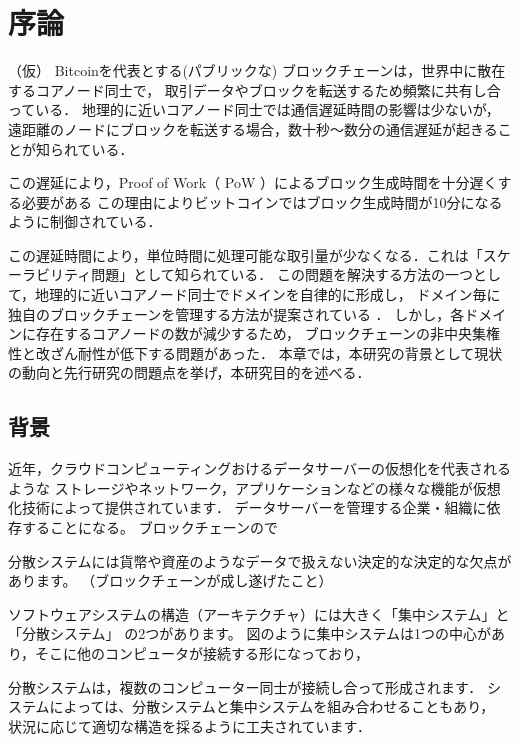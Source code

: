 \documentclass[a4paper,12pt]{jsarticle}
\begin{document}

\section{序論}

（仮）
Bitcoinを代表とする(パブリックな) ブロックチェーンは，世界中に散在するコアノード同士で，
取引データやブロックを転送するため頻繁に共有し合っている．
地理的に近いコアノード同士では通信遅延時間の影響は少ないが，
遠距離のノードにブロックを転送する場合，数十秒〜数分の通信遅延が起きることが知られている．

この遅延により，Proof of Work（ PoW ）によるブロック生成時間を十分遅くする必要がある
この理由によりビットコインではブロック生成時間が10分になるように制御されている．

この遅延時間により，単位時間に処理可能な取引量が少なくなる．これは「スケーラビリティ問題」として知られている． 
この問題を解決する方法の一つとして，地理的に近いコアノード同士でドメインを自律的に形成し，
ドメイン毎に独自のブロックチェーンを管理する方法が提案されている \cite{fujihara1}\cite{fujihara2}．
しかし，各ドメインに存在するコアノードの数が減少するため，
ブロックチェーンの非中央集権性と改ざん耐性が低下する問題があった．
本章では，本研究の背景として現状の動向と先行研究の問題点を挙げ，本研究目的を述べる．


\subsection{背景}
近年，クラウドコンピューティングおけるデータサーバーの仮想化を代表されるような
ストレージやネットワーク，アプリケーションなどの様々な機能が仮想化技術によって提供されています．
データサーバーを管理する企業・組織に依存することになる。
ブロックチェーンので

分散システムには貨幣や資産のようなデータで扱えない決定的な決定的な欠点があります。
（ブロックチェーンが成し遂げたこと）

ソフトウェアシステムの構造（アーキテクチャ）には大きく「集中システム」と「分散システム」
の2つがあります。
図のように集中システムは1つの中心があり，そこに他のコンピュータが接続する形になっており，

分散システムは，複数のコンピューター同士が接続し合って形成されます．
システムによっては、分散システムと集中システムを組み合わせることもあり，
状況に応じて適切な構造を採るように工夫されています．
\end{document}

